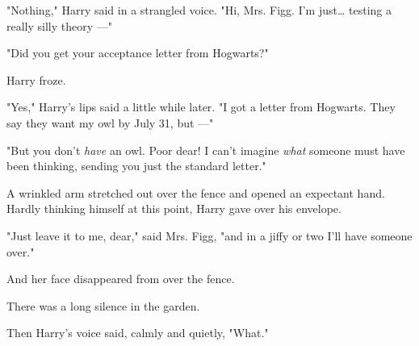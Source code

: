 "Nothing," Harry said in a strangled voice. "Hi, Mrs. Figg.
I'm just{\ldots} testing a really silly theory ---"

"Did you get your acceptance letter from Hogwarts?"

Harry froze.

"Yes," Harry's lips said a little while later. "I got a letter
from Hogwarts. They say they want my owl by July 31, but ---"

"But you don't \emph{have} an owl. Poor dear! I can't imagine
\emph{what} someone must have been thinking, sending you just
the standard letter."

A wrinkled arm stretched out over the fence and opened
an expectant hand. Hardly thinking himself at this point,
Harry gave over his envelope.

"Just leave it to me, dear," said Mrs. Figg, "and in a jiffy
or two I'll have someone over."

And her face disappeared from over the fence.

There was a long silence in the garden.

Then Harry's voice said, calmly and quietly, "What."
